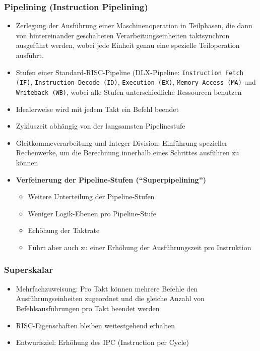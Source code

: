 \subsubsection{Pipelining (Instruction Pipelining)}
\begin{itemize}
	\item Zerlegung der Ausführung einer Maschinenoperation in Teilphasen, die dann von hintereinander geschalteten Verarbeitungseinheiten taktsynchron ausgeführt werden, wobei jede Einheit genau eine spezielle Teiloperation ausführt.
	\item Stufen einer Standard-RISC-Pipeline (DLX-Pipeline: \texttt{Instruction Fetch (IF)}, \texttt{Instruction Decode (ID)}, \texttt{Execution (EX)}, \texttt{Memory Access (MA)} und \texttt{Writeback (WB)}, wobei alle Stufen unterschiedliche Ressourcen benutzen
	\item Idealerweise wird mit jedem Takt ein Befehl beendet
	\item Zykluszeit abhängig von der langsamsten Pipelinestufe
	\item Gleitkommeverarbeitung und Integer-Division: Einführung spezieller Rechenwerke, um die Berechnung innerhalb eines Schrittes ausführen zu können
	\item \textbf{Verfeinerung der Pipeline-Stufen ("`Superpipelining"')}
	\begin{itemize}
		\item Weitere Unterteilung der Pipeline-Stufen
		\item Weniger Logik-Ebenen pro Pipeline-Stufe %
		\item Erhöhung der Taktrate
		\item Führt aber auch zu einer Erhöhung der Ausführungszeit pro Instruktion
	\end{itemize}
\end{itemize}

\subsubsection{Superskalar}
\begin{itemize}
	\item Mehrfachzuweisung: Pro Takt können mehrere Befehle den Ausführungseinheiten zugeordnet und die gleiche Anzahl von Befehlsausführungen pro Takt beendet werden
	\item RISC-Eigenschaften bleiben weitestgehend erhalten
	\item Entwurfsziel: Erhöhung des IPC (Instruction per Cycle)
\end{itemize}

